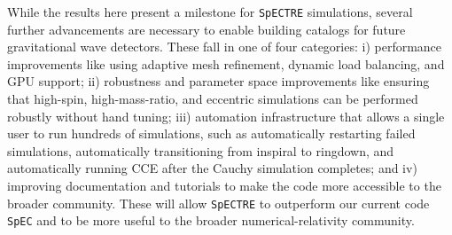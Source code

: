 \begin{bibunit}[unsrtnat]
While the results here present a milestone for \texttt{SpECTRE} simulations,
several further advancements are necessary to enable building catalogs for
future gravitational wave detectors. These fall in one of four categories: i)
performance improvements like using adaptive mesh refinement, dynamic load
balancing, and GPU support; ii) robustness and parameter space improvements like
ensuring that high-spin, high-mass-ratio, and eccentric simulations can be
performed robustly without hand tuning; iii) automation infrastructure that
allows a single user to run hundreds of simulations, such as automatically
restarting failed simulations, automatically transitioning from inspiral to
ringdown, and automatically running CCE after the Cauchy simulation completes;
and iv) improving documentation and tutorials to make the code more accessible
to the broader community. 
These will allow \texttt{SpECTRE} to outperform our current code \texttt{SpEC}
and to be more useful to the broader numerical-relativity community.

\ack


\end{bibunit}
